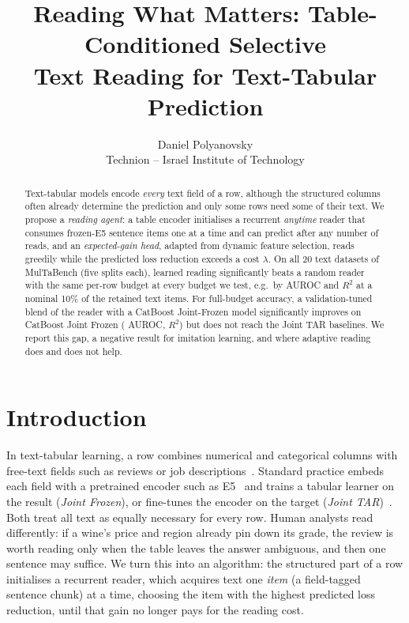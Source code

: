 \documentclass{article}
\title{Reading What Matters: Table-Conditioned Selective\\Text Reading for Text-Tabular Prediction}
\author{Daniel Polyanovsky\\Technion -- Israel Institute of Technology}
\begin{document}
\maketitle

\begin{abstract}
Text-tabular models encode \emph{every} text field of a row, although the structured columns often already determine the prediction and only some rows need some of their text.
We propose a \emph{reading agent}: a table encoder initialises a recurrent \emph{anytime} reader that consumes frozen-E5 sentence items one at a time and can predict after any number of reads, and an \emph{expected-gain head}, adapted from dynamic feature selection, reads greedily while the predicted loss reduction exceeds a cost $\lambda$.
On all 20 text datasets of MulTaBench (five splits each), learned reading significantly beats a random reader with the same per-row budget at every budget we test, e.g.\ by \gainContentTenClsDelta{} AUROC and \gainContentTenRegDelta{} $R^2$ at a nominal 10\% of the retained text items.
For full-budget accuracy, a validation-tuned blend of the reader with a CatBoost Joint-Frozen model significantly improves on CatBoost Joint Frozen (\blendVsLocalCBClsDelta{} AUROC, \blendVsLocalCBRegDelta{} $R^2$) but does not reach the Joint TAR baselines.
We report this gap, a negative result for imitation learning, and where adaptive reading does and does not help.
\end{abstract}

\section{Introduction}

In text-tabular learning, a row combines numerical and categorical columns with free-text fields such as reviews or job descriptions~\cite{arazi2026multabench}.
Standard practice embeds each field with a pretrained encoder such as E5~\cite{wang2022e5} and trains a tabular learner on the result (\emph{Joint Frozen}), or fine-tunes the encoder on the target (\emph{Joint TAR})~\cite{arazi2025tabstar,arazi2026multabench}.
Both treat all text as equally necessary for every row.
Human analysts read differently: if a wine's price and region already pin down its grade, the review is worth reading only when the table leaves the answer ambiguous, and then one sentence may suffice.
We turn this into an algorithm: the structured part of a row initialises a recurrent reader, which acquires text one \emph{item} (a field-tagged sentence chunk) at a time, choosing the item with the highest predicted loss reduction, until that gain no longer pays for the reading cost.
\end{document}

